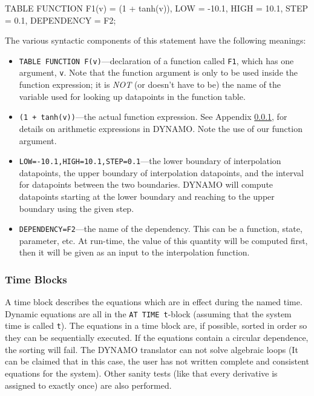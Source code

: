 \begin{example}
        TABLE FUNCTION F1(v) = (1 + tanh(v)), 
                       LOW = -10.1, HIGH = 10.1, STEP = 0.1, 
                       DEPENDENCY = F2;
\end{example}

The various syntactic components of this statement have the following
meanings: 
\begin{itemize}
\item \texttt{TABLE FUNCTION F(v)}---declaration of a function called \texttt{F1}, which has one argument, \texttt{v}. Note that the function argument is only to be used inside the function expression; it is \emph{NOT} (or doesn't have to be) the name of the variable used for looking up datapoints in the function table.
\item \texttt{(1 + tanh(v))}---the actual function expression. See Appendix \ref{DYNAMOtimeblock}, for details on arithmetic expressions in DYNAMO. Note the use of our function argument.
\item \texttt{LOW=-10.1,HIGH=10.1,STEP=0.1}---the lower boundary of interpolation datapoints, the upper boundary of interpolation datapoints, and the interval for datapoints between the two boundaries. DYNAMO will compute datapoints starting at the lower boundary and reaching to the upper boundary using the given step.
\item \texttt{DEPENDENCY=F2}---the name of the dependency. This can be a function, state, parameter, etc. At run-time, the value of this quantity will be computed first, then it will be given as an input to the interpolation function.
\end{itemize}

\subsubsection{Time Blocks}
\label{DYNAMOtimeblock}

A time block describes the equations which are in effect during the
named time. Dynamic equations are all in the \texttt{AT TIME t}-block
(assuming that the system time is called \texttt{t}).  The equations in
a time block are, if possible, sorted in order so they can be
sequentially executed. If the equations contain a circular dependence,
the sorting will fail. The DYNAMO translator can not solve algebraic
loops (It can be claimed that in this case, the user has not written
complete and consistent equations for the system). Other sanity tests
(like that every derivative is assigned to exactly once) are also
performed.

